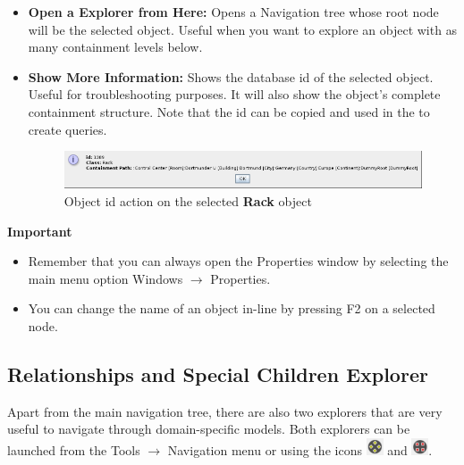 \documentclass[a4paper]{article}
\begin{document}
\begin{itemize}
		\item \textbf{Open a Explorer from Here:} Opens a Navigation tree whose root node will be the selected object. Useful when you want to explore an object with as many containment levels below.
		\item \textbf{Show More Information:} Shows the database id of the selected object. Useful for troubleshooting purposes. It will also show the object's complete containment structure. Note that the id can be copied and used in the \textbf{} to create queries.
			\begin{figure}[h!]
				\centering
				\includegraphics[width=\linewidth]{img/action_show_object_id.png}
				\caption{Object id action on the selected \textbf{Rack} object}
				\label{fig:action_show_object_id}
			\end{figure}
	\end{itemize}
	\begin{framed} {\large \textbf{Important}}
		\begin{itemize}
			\item Remember that you can always open the Properties window by selecting the main menu option Windows $\rightarrow$ Properties.
			\item You can change the name of an object in-line by pressing F2 on a selected node.
		\end{itemize}
	\end{framed}
	\subsection{Relationships and Special Children Explorer} \label{sec:extra_explorers}
	Apart from the main navigation tree, there are also two explorers that are very useful to navigate through domain-specific models. Both explorers can be launched from the Tools $\rightarrow$ Navigation menu or using the icons \includegraphics[width=0.5cm]{img/icon_relationship_explorer.png} and \includegraphics[width=0.5cm]{img/icon_special_children_explorer.png}.
\end{document}
